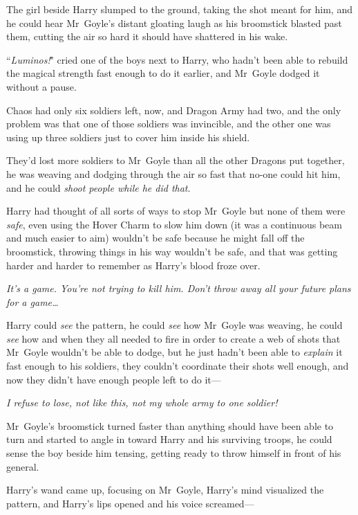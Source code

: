 \later

The girl beside Harry slumped to the ground, taking the shot meant for him, and he could hear Mr~Goyle's distant gloating laugh as his broomstick blasted past them, cutting the air so hard it should have shattered in his wake.

``\emph{Luminos!}" cried one of the boys next to Harry, who hadn't been able to rebuild the magical strength fast enough to do it earlier, and Mr~Goyle dodged it without a pause.

Chaos had only six soldiers left, now, and Dragon Army had two, and the only problem was that one of those soldiers was invincible, and the other one was using up three soldiers just to cover him inside his shield.

They'd lost more soldiers to Mr~Goyle than all the other Dragons put together, he was weaving and dodging through the air so fast that no-one could hit him, and he could \emph{shoot people while he did that}.

Harry had thought of all sorts of ways to stop Mr~Goyle but none of them were \emph{safe}, even using the Hover Charm to slow him down (it was a continuous beam and much easier to aim) wouldn't be safe because he might fall off the broomstick, throwing things in his way wouldn't be safe, and that was getting harder and harder to remember as Harry's blood froze over.

\emph{It's a game. You're not trying to \emph{kill} him. Don't throw away all your future plans for a game{\ldots}}

Harry could \emph{see} the pattern, he could \emph{see} how Mr~Goyle was weaving, he could \emph{see} how and when they all needed to fire in order to create a web of shots that Mr~Goyle wouldn't be able to dodge, but he just hadn't been able to \emph{explain} it fast enough to his soldiers, they couldn't coordinate their shots well enough, and now they didn't have enough people left to do it—

\emph{I refuse to lose, not like this, not my whole army to one soldier!}

Mr~Goyle's broomstick turned faster than anything should have been able to turn and started to angle in toward Harry and his surviving troops, he could sense the boy beside him tensing, getting ready to throw himself in front of his general.

\emph{}

Harry's wand came up, focusing on Mr~Goyle, Harry's mind visualized the pattern, and Harry's lips opened and his voice screamed—

